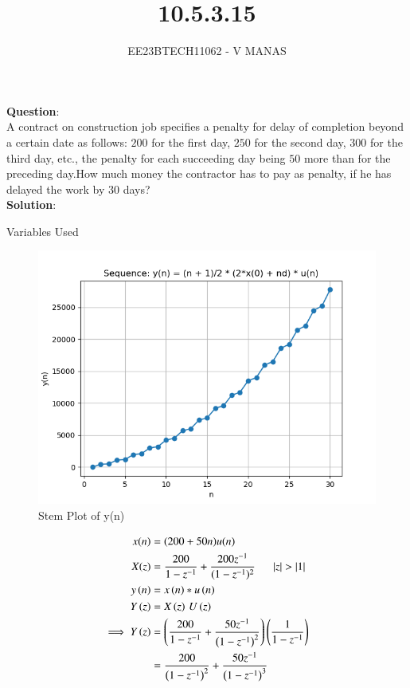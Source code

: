\documentclass[journal,12pt,twocolumn]{IEEEtran}
\theoremstyle{remark}
\begin{document}

\vspace{3cm}

\title{10.5.3.15}
\author{EE23BTECH11062 - V MANAS}
\maketitle
\newpage

\bigskip

\renewcommand{\thefigure}{\arabic{figure}}
\renewcommand{\thetable}{\arabic{table}}
\textbf{Question}:\\A contract on construction job specifies a penalty for delay of completion beyond a certain date as follows: \rupee $200$ for the first day, \rupee $250$ for the second day, \rupee $300$ for the third day, etc., the penalty for each succeeding day being \rupee $50$ more than for the preceding day.How much money the contractor has to pay as penalty, if he has delayed the work by $30$ days?\\
\textbf{Solution}:
\begin{table}[h]
    \centering
    
    \caption{Variables Used}
    \label{tab:table_10.5.3.15}
\end{table}
\begin{figure}[h]
    \centering
    \includegraphics[width=1.1\linewidth]{figs/graph.png}
    \caption{Stem Plot of y(n)}
    \label{stemplot1}
\end{figure}
\begin{align}
x(n)&=(200+50n)u(n)\\
X(z)&=\frac{200}{1-z^{-1}}+\frac{200z^{-1}}{(1-z^{-1})^2}\:\:
\quad\left\vert z\right\vert>\left\vert1\right\vert\\
y\left(n\right)&=x\left(n\right)*u\left(n\right)\\
Y\left(z\right)&=X\left(z\right)\,U\left(z\right)\\
\implies Y\left(z\right)&=\left(\frac{200}{1-z^{-1}}+\frac{50z^{-1}}{\left(1-
z^{-1}\right)^2}\right)\left(\frac{1}{1-z^{-1}}\right)\\
&=\frac{200}{\left(1-z^{-1}\right)^2}+\frac{50z^{-1}}{\left(1-z^{-1}\right)^3}
\end{align}
\end{document}
